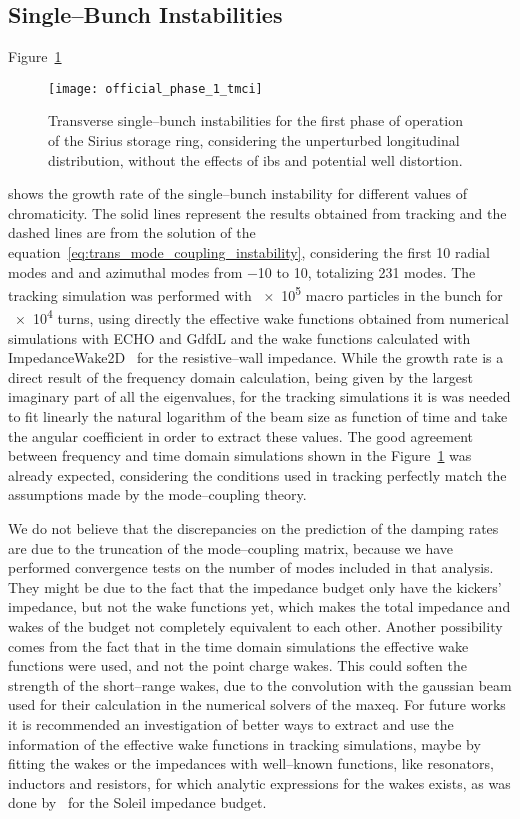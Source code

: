 \subsection{Single--Bunch Instabilities}

    Figure~\ref{fig:ph1_chrom_tmci}
    \begin{figure}
        \centering
        \texttt{[image: official\_phase\_1\_tmci]}
        \caption{Transverse single--bunch instabilities for the first phase of operation of the Sirius storage ring, considering the unperturbed longitudinal distribution, without the effects of \gls{ibs} and potential well distortion.}
        \label{fig:ph1_chrom_tmci}
    \end{figure}
    shows the growth rate of the single--bunch instability for different values of chromaticity. The solid lines represent the results obtained from tracking and the dashed lines are from the solution of the equation~\eqref{eq:trans_mode_coupling_instability}, considering the first 10 radial modes and and azimuthal modes from \num{-10} to \num{10}, totalizing \num{231} modes. The tracking simulation was performed with \num{e5} macro particles in the bunch for \num{e4} turns, using directly the effective wake functions obtained from numerical simulations with ECHO and GdfdL and the wake functions calculated with ImpedanceWake2D~\cite{Mounet2010} for the resistive--wall impedance.
    While the growth rate is a direct result of the frequency domain calculation, being given by the largest imaginary part of all the eigenvalues, for the tracking simulations it is was needed to fit linearly the natural logarithm of the beam size as function of time and take the angular coefficient in order to extract these values. The good agreement between frequency and time domain simulations shown in the Figure~\ref{fig:ph1_chrom_tmci} was already expected, considering the conditions used in tracking perfectly match the assumptions made by the mode--coupling theory.

    We do not believe that the discrepancies on the prediction of the damping rates are due to the truncation of the mode--coupling matrix, because we have performed convergence tests on the number of modes included in that analysis. They might be due to the fact that the impedance budget only have the kickers' impedance, but not the wake functions yet, which makes the total impedance and wakes of the budget not completely equivalent to each other. Another possibility comes from the fact that in the time domain simulations the effective wake functions were used, and not the point charge wakes. This could soften the strength of the short--range wakes, due to the convolution with the gaussian beam used for their calculation in the numerical solvers of the \gls{maxeq}. For future works it is recommended an investigation of better ways to extract and use the information of the effective wake functions in tracking simulations, maybe by fitting the wakes or the impedances with well--known functions, like resonators, inductors and resistors, for which analytic expressions for the wakes exists, as was done by~ for the Soleil impedance budget.

